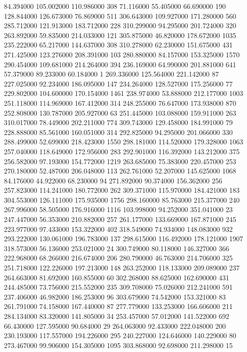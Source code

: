 84.394000	105.002000	110.986000	308
71.116000	55.405000	66.690000	190
128.844000	126.673000	76.869000	511
306.643000	109.927000	171.280000	560
285.712000	121.913000	183.712000	228
310.299000	94.295000	201.724000	320
263.892000	59.835000	214.033000	121
305.875000	46.820000	178.672000	1035
235.222000	65.217000	144.637000	308
310.278000	62.230000	151.675000	431
271.425000	123.276000	208.391000	103
280.880000	84.157000	153.325000	1570
290.454000	109.681000	214.264000	394
236.169000	64.990000	201.881000	641
57.379000	89.233000	60.184000	1
269.336000	125.564000	221.142000	87
227.025000	92.234000	186.095000	147
234.264000	128.527000	175.256000	77
229.802000	104.600000	170.154000	1461
238.974000	53.888000	212.177000	1003
251.118000	114.969000	167.412000	314
248.255000	76.647000	173.938000	870
252.808000	130.787000	205.927000	63
251.445000	103.088000	159.911000	263
310.017000	78.449000	202.211000	774
309.743000	129.458000	184.991000	79
228.888000	85.561000	160.051000	314
292.825000	94.295000	201.066000	330
288.499000	52.699000	218.423000	1550
298.181000	114.520000	179.328000	1063
257.040000	118.649000	172.956000	283
292.901000	116.392000	143.212000	375
256.582000	97.193000	154.772000	1219
263.685000	75.383000	220.457000	253
270.180000	52.487000	206.048000	113
262.761000	52.207000	145.625000	1068
84.176000	44.922000	68.230000	94
271.892000	90.374000	156.362000	256
257.823000	114.241000	180.772000	262
309.371000	115.970000	184.421000	183
304.553000	126.111000	175.935000	1756
298.160000	85.763000	215.377000	240
267.996000	58.505000	176.916000	1116
103.998000	94.252000	351.041000	23
247.447000	56.353000	210.882000	257
261.177000	133.669000	167.871000	245
223.977000	97.433000	153.322000	402
318.549000	74.934000	148.083000	932
293.222000	130.061000	196.783000	137
298.615000	116.492000	178.121000	1907
318.573000	56.136000	253.021000	24
300.749000	80.118000	146.327000	366
222.968000	68.266000	216.674000	206
280.790000	46.763000	214.706000	325
251.718000	122.226000	197.213000	148
263.252000	118.133000	209.089000	237
264.663000	81.692000	160.855000	60
302.268000	88.625000	162.690000	431
244.485000	73.756000	215.552000	235
309.708000	75.026000	212.241000	591
237.406000	46.982000	186.253000	96
303.679000	74.542000	153.321000	83
261.791000	74.158000	167.440000	87
277.779000	133.253000	166.606000	211
284.134000	83.320000	141.805000	34
253.457000	57.012000	141.522000	692
66.430000	127.595000	90.684000	29
264.063000	92.433000	222.048000	200
230.193000	117.557000	194.226000	295
240.227000	124.646000	140.229000	80
273.467000	99.906000	154.305000	1095
303.868000	92.698000	211.298000	15
